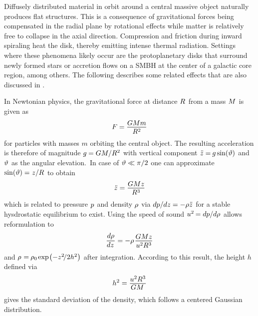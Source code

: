 Diffusely distributed material in orbit around a central massive object naturally produces flat structures. This is a
consequence of gravitational forces being compensated in the radial plane by rotational effects while matter is relatively
free to collapse in the axial direction. Compression and friction during inward spiraling heat the disk, thereby emitting
intense thermal radiation. Settings where these phenomena likely occur are the protoplanetary disks that surround newly formed
stars or accretion flows on a SMBH at the center of a galactic core region, among others. The following describes some related effects
that are also discussed in \cite{Longair_2011}.

In Newtonian physics, the gravitational force at distance $R \kern+0.5pt$ from a mass $M \kern+0.5pt$ is given as
\begin{equation}
	F = \frac{\raisebox{-0.3ex}{$GMm$}}{R^2}
	\label{eqn:newton}
\end{equation}
for particles with masses $m$ orbiting the central object. The resulting acceleration is therefore of magnitude
$g \kern-0.3pt = GM / \smash{R^2}$ with vertical component $\ddot{z} = \kern-0.6pt g \sin(\vartheta)$ and
$\vartheta \kern+0.5pt$ as the angular elevation.~In case of $\kern+0.5pt \vartheta \ll \pi / 2$ one can approximate
$\sin(\vartheta) = \kern+0.3pt z / \kern-0.2pt R \kern+0.5pt$ to obtain
\begin{equation*}
	\ddot{z} = \frac{\raisebox{-0.3ex}{$GMz$}}{R^3}
\end{equation*}
which is related to pressure $p \kern+0.5pt$ and density $\kern-0.5pt \rho \kern+0.5pt$ via
$d \kern-0.1pt p / \kern-0.1pt dz = -\rho \ddot{z} \kern+0.5pt$ for a stable hysdrostatic equilibrium to exist. Using the speed
of sound $\smash{u^2} \kern-0.7pt = d \kern-0.1pt p / \kern-0.1pt d \kern-0.1pt \rho \kern+0.5pt$ allows reformulation to
\begin{equation}
	\frac{d \kern-0.1pt \rho}{\raisebox{0.2ex}{$dz \kern+1.0pt$}} =
	-\rho \kern+1.0pt \frac{\raisebox{-0.3ex}{$GMz$}}{u^2R^3}
	\label{eqn:density}
\end{equation}
and $\rho \kern+0.6pt = \kern-0.6pt \rho_0 \kern-0.5pt \exp \kern-1.0pt \smash{\bigl( -z^2 \kern-1.8pt / 2 h^2 \bigr)}$
after integration. According to this result, the height $h$ defined via
\begin{equation}
	h^2 = \frac{\raisebox{-0.3ex}{$u^2R^3$}}{\raisebox{0.2ex}{$GM \kern+1.5pt$}}
	\label{eqn:height}
\end{equation}
gives the standard deviation of the density, which follows a centered Gaussian distribution.


